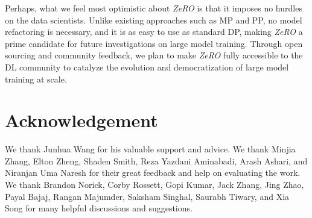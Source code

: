 \documentclass{article}
\newcommand{\name}{\emph{ZeRO}\xspace}
\begin{document}
Perhaps, what we feel most optimistic about \name is that it imposes no hurdles on the data scientists. Unlike existing approaches such as MP and PP, no model refactoring is necessary, and it is as easy to use as standard DP, making \name a prime candidate for future investigations on large model training. Through open sourcing and community feedback, we plan to make \name fully accessible to the DL community to catalyze the evolution and democratization of large model training at scale.  
\section*{Acknowledgement}

We thank Junhua Wang for his valuable support and advice. We thank Minjia
Zhang, Elton Zheng, Shaden Smith, Reza Yazdani Aminabadi, Arash Ashari, and
Niranjan Uma Naresh for their great feedback and help on evaluating the work.
We thank Brandon Norick, Corby Rossett, Gopi Kumar, Jack Zhang, Jing Zhao,
Payal Bajaj, Rangan Majumder, Saksham Singhal, Saurabh Tiwary, and Xia Song for
many helpful discussions and suggestions.




\newpage
\appendix
\end{document}
